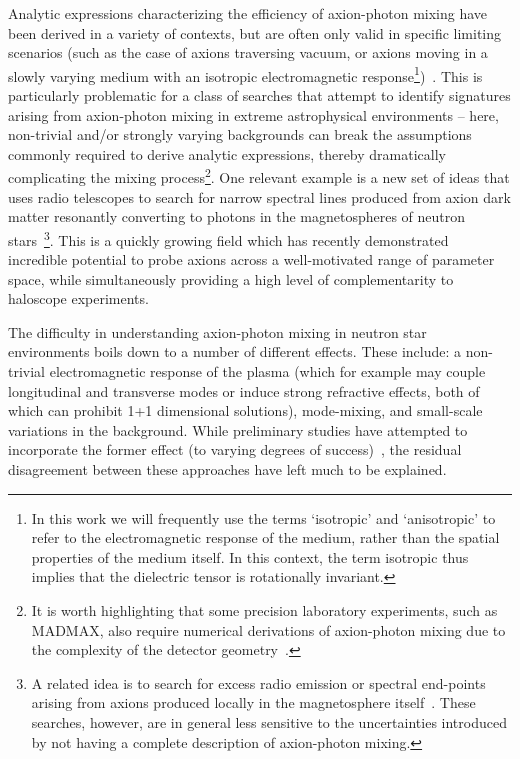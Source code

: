 \documentclass[twocolumn,superscriptaddress,floatfix,preprintnumbers,prd,nofootinbib,aps,10pt]{revtex4-2}
\renewcommand\({\left(}
\renewcommand\){\right)}
\renewcommand\[{\left[}
\renewcommand\]{\right]}
\begin{document}
Analytic expressions characterizing the efficiency of axion-photon mixing have been derived in a variety of contexts, but are often only valid in specific limiting scenarios (such as the case of axions traversing vacuum, or axions moving in a slowly varying medium with an isotropic electromagnetic response\footnote{In this work we will frequently use the terms `isotropic' and `anisotropic' to refer to the electromagnetic response of the medium, rather than the spatial properties of the medium itself. In this context, the term isotropic thus implies that the dielectric tensor is rotationally invariant.})~\cite{Raffelt:1987im,Hook:2018iia,Battye:2019aco,Marsh:2021ajy,Battye2021,Witte2021}. This is particularly problematic for a class of searches that attempt to identify signatures arising from axion-photon mixing in extreme astrophysical environments -- here, non-trivial and/or strongly varying backgrounds can break the assumptions commonly required to derive analytic expressions, thereby dramatically complicating the mixing process\footnote{It is worth highlighting that some precision laboratory experiments, such as MADMAX, also require numerical derivations of axion-photon mixing due to the complexity of the detector geometry~\cite{knirck2019first}.}. One relevant example is a new set of ideas that uses radio telescopes to search for narrow spectral lines produced from axion dark matter resonantly converting  to photons in the magnetospheres of neutron stars~\cite{Pshirkov:2007st,Huang:2018lxq,Hook:2018iia,Safdi:2018oeu,Battye:2019aco,Leroy:2019ghm,Foster:2020pgt,Prabhu_2020,Buckley2021,Edwards:2020afl,Witte2021,Battye2021,battye2021robust,Nurmi:2021xds,Foster:2022fxn,Witte:2022cjj,Battye:2023oac,mcdonald2023generalized,Xue:2023ejt,Tjemsland:2023vvc}\footnote{A related idea is to search for excess radio emission or spectral end-points arising from axions produced locally in the magnetosphere itself~\cite{Prabhu2021,Noordhuis:2022ljw,noordhuis2023axion,Caputo:2023cpv}. These searches, however, are in general less sensitive to the uncertainties introduced by not having a complete description of axion-photon mixing.}. This is a quickly growing field which has recently demonstrated incredible potential to probe axions across a well-motivated range of parameter space, while simultaneously providing a high level of complementarity to haloscope experiments. 

The difficulty in understanding axion-photon mixing in neutron star environments boils down to a number of different effects. These include: a non-trivial electromagnetic response of the plasma (which for example may couple longitudinal and transverse modes or induce strong refractive effects, both of which can prohibit 1+1 dimensional solutions), mode-mixing, and small-scale variations in the background. While preliminary studies have attempted to incorporate the former effect (to varying degrees of success)~\cite{Hook:2018iia,Battye:2019aco,Witte2021,millar2021axionphotonUPDATED,mcdonald2023axionphoton}, the residual disagreement between these approaches have left much to be explained.
\end{document}
